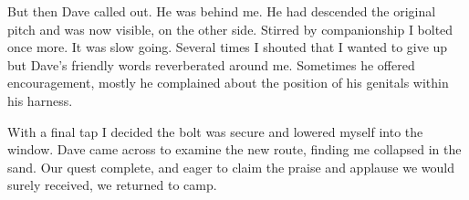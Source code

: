 But then Dave called out. He was behind me. He had descended the original pitch and was now visible, on the other side. Stirred by companionship I bolted once more. It was slow going. Several times I shouted that I wanted to give up but Dave's friendly words reverberated around me. Sometimes he offered encouragement, mostly he complained about the position of his genitals within his harness. 

With a final tap I decided the bolt was secure and lowered myself into the window. Dave came across to examine the new route, finding me collapsed in the sand. Our quest complete, and eager to claim the praise and applause we would surely received, we returned to camp.

